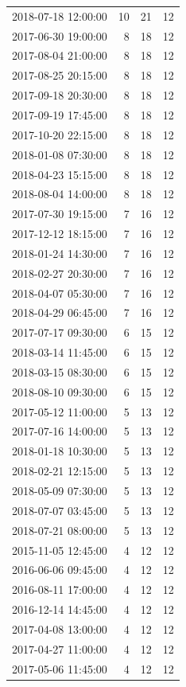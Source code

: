 \begin{tabular}{lrrr}
2018-07-18 12:00:00 & 10 & 21 & 12 \\
2017-06-30 19:00:00 & 8 & 18 & 12 \\
2017-08-04 21:00:00 & 8 & 18 & 12 \\
2017-08-25 20:15:00 & 8 & 18 & 12 \\
2017-09-18 20:30:00 & 8 & 18 & 12 \\
2017-09-19 17:45:00 & 8 & 18 & 12 \\
2017-10-20 22:15:00 & 8 & 18 & 12 \\
2018-01-08 07:30:00 & 8 & 18 & 12 \\
2018-04-23 15:15:00 & 8 & 18 & 12 \\
2018-08-04 14:00:00 & 8 & 18 & 12 \\
2017-07-30 19:15:00 & 7 & 16 & 12 \\
2017-12-12 18:15:00 & 7 & 16 & 12 \\
2018-01-24 14:30:00 & 7 & 16 & 12 \\
2018-02-27 20:30:00 & 7 & 16 & 12 \\
2018-04-07 05:30:00 & 7 & 16 & 12 \\
2018-04-29 06:45:00 & 7 & 16 & 12 \\
2017-07-17 09:30:00 & 6 & 15 & 12 \\
2018-03-14 11:45:00 & 6 & 15 & 12 \\
2018-03-15 08:30:00 & 6 & 15 & 12 \\
2018-08-10 09:30:00 & 6 & 15 & 12 \\
2017-05-12 11:00:00 & 5 & 13 & 12 \\
2017-07-16 14:00:00 & 5 & 13 & 12 \\
2018-01-18 10:30:00 & 5 & 13 & 12 \\
2018-02-21 12:15:00 & 5 & 13 & 12 \\
2018-05-09 07:30:00 & 5 & 13 & 12 \\
2018-07-07 03:45:00 & 5 & 13 & 12 \\
2018-07-21 08:00:00 & 5 & 13 & 12 \\
2015-11-05 12:45:00 & 4 & 12 & 12 \\
2016-06-06 09:45:00 & 4 & 12 & 12 \\
2016-08-11 17:00:00 & 4 & 12 & 12 \\
2016-12-14 14:45:00 & 4 & 12 & 12 \\
2017-04-08 13:00:00 & 4 & 12 & 12 \\
2017-04-27 11:00:00 & 4 & 12 & 12 \\
2017-05-06 11:45:00 & 4 & 12 & 12 \\

\end{tabular}
